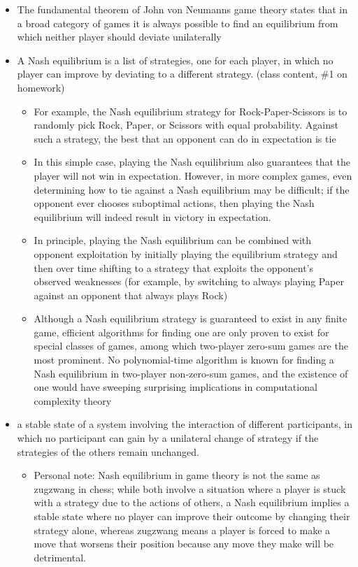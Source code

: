 \documentclass[
]{article}
\begin{document}
\begin{itemize}
\item
  The fundamental theorem of John von Neumann\textquotesingle s game
  theory states that in a broad category of games it is always possible
  to find an equilibrium from which neither player should deviate
  unilaterally
\item
  A Nash equilibrium is a list of strategies, one for each player, in
  which no player can improve by deviating to a different strategy.
  (class content, \#1 on homework)

  \begin{itemize}
  \item
    For example, the Nash equilibrium strategy for Rock-Paper-Scissors
    is to randomly pick Rock, Paper, or Scissors with equal probability.
    Against such a strategy, the best that an opponent can do in
    expectation is tie
  \item
    In this simple case, playing the Nash equilibrium also guarantees
    that the player will not win in expectation. However, in more
    complex games, even determining how to tie against a Nash
    equilibrium may be difficult; if the opponent ever chooses
    suboptimal actions, then playing the Nash equilibrium will indeed
    result in victory in expectation.
  \item
    In principle, playing the Nash equilibrium can be combined with
    opponent exploitation by initially playing the equilibrium strategy
    and then over time shifting to a strategy that exploits the
    opponent's observed weaknesses (for example, by switching to always
    playing Paper against an opponent that always plays Rock)
  \item
    Although a Nash equilibrium strategy is guaranteed to exist in any
    finite game, efficient algorithms for finding one are only proven to
    exist for special classes of games, among which two-player zero-sum
    games are the most prominent. No polynomial-time algorithm is known
    for finding a Nash equilibrium in two-player non-zero-sum games, and
    the existence of one would have sweeping surprising implications in
    computational complexity theory
  \end{itemize}
\item
  a stable state of a system involving the interaction of different
  participants, in which no participant can gain by a unilateral change
  of strategy if the strategies of the others remain unchanged.

  \begin{itemize}
  \item
    Personal note: Nash equilibrium in game theory is not the same as
    zugzwang in chess; while both involve a situation where a player is
    stuck with a strategy due to the actions of others, a Nash
    equilibrium implies a stable state where no player can improve their
    outcome by changing their strategy alone, whereas zugzwang means a
    player is forced to make a move that worsens their position because
    any move they make will be detrimental.
  \end{itemize}
\end{itemize}
\end{document}
